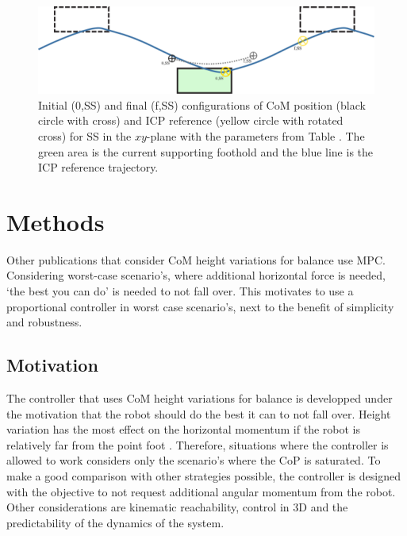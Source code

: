 \begin{figure}[h]
\centering
  \includegraphics[width=.8\linewidth]{STYLESTUFF/ICPplan3StepComICPrSS.png}
   \caption{Initial (0,SS) and final (f,SS) configurations of \ac{CoM} position (black circle with cross) and \ac{ICP} reference (yellow circle with rotated cross) for \ac{SS} in the $xy$-plane with the parameters from Table . The green area is the current supporting foothold and the blue line is the \ac{ICP} reference trajectory.}
    \label{fig:3foot}
\end{figure}

\newpage
\section{Methods}
Other publications that consider \ac{CoM} height variations for balance use \ac{MPC}. Considering worst-case scenario's, where additional horizontal force is needed, `the best you can do' is needed to not fall over. This motivates to use a proportional controller in worst case scenario's, next to the benefit of simplicity and robustness.

\subsection{Motivation}
The controller that uses \ac{CoM} height variations for balance is developped under the motivation that the robot should do the best it can to not fall over. Height variation has the most effect on the horizontal momentum if the robot is relatively far from the point foot . Therefore, situations where the controller is allowed to work considers only the scenario's where the \ac{CoP} is saturated.
\paraskip
To make a good comparison with other strategies possible, the controller is designed with the objective to not request additional angular momentum from the robot. Other considerations are kinematic reachability, control in \ac{3D} and the predictability of the dynamics of the system.

